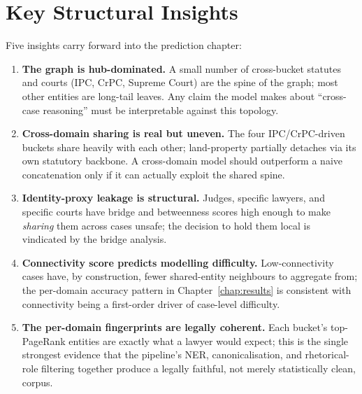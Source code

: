 \section{Key Structural Insights}
\label{sec:key_insights}

Five insights carry forward into the prediction chapter:

\begin{enumerate}
  \item \textbf{The graph is hub-dominated.} A small number of
    cross-bucket statutes and courts (IPC, CrPC, Supreme Court) are
    the spine of the graph; most other entities are long-tail leaves.
    Any claim the model makes about ``cross-case reasoning'' must be
    interpretable against this topology.
  \item \textbf{Cross-domain sharing is real but uneven.} The four
    IPC/CrPC-driven buckets share heavily with each other; land-property
    partially detaches via its own statutory backbone. A cross-domain
    model should outperform a naive concatenation only if it can
    actually exploit the shared spine.
  \item \textbf{Identity-proxy leakage is structural.} Judges,
    specific lawyers, and specific courts have bridge and betweenness
    scores high enough to make \emph{sharing} them across cases
    unsafe; the decision to hold them local is vindicated by the
    bridge analysis.
  \item \textbf{Connectivity score predicts modelling difficulty.}
    Low-connectivity cases have, by construction, fewer shared-entity
    neighbours to aggregate from; the per-domain accuracy pattern in
    Chapter~\ref{chap:results} is consistent with connectivity being a
    first-order driver of case-level difficulty.
  \item \textbf{The per-domain fingerprints are legally coherent.}
    Each bucket's top-PageRank entities are exactly what a lawyer
    would expect; this is the single strongest evidence that the
    pipeline's NER, canonicalisation, and rhetorical-role filtering
    together produce a legally faithful, not merely statistically
    clean, corpus.
\end{enumerate}
